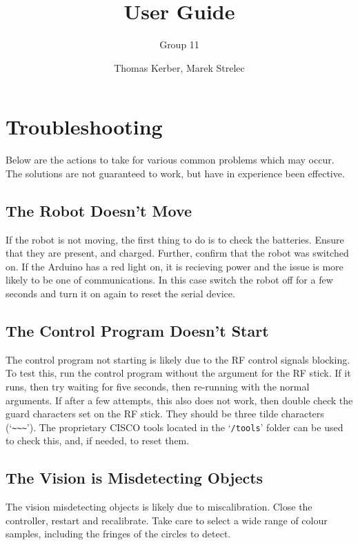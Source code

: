 \documentclass[a4paper,12pt]{scrartcl}
\author{Thomas Kerber, Marek Strelec}
\title{User Guide}
\subtitle{Group 11}
\begin{document}
\maketitle





\section{Troubleshooting}

Below are the actions to take for various common problems which may occur. The
solutions are not guaranteed to work, but have in experience been effective.

\subsection{The Robot Doesn't Move}

If the robot is not moving, the first thing to do is to check the batteries.
Ensure that they are present, and charged. Further, confirm that the robot was
switched on. If the Arduino has a red light on, it is recieving power and the
issue is more likely to be one of communications. In this case switch the robot
off for a few seconds and turn it on again to reset the serial device.

\subsection{The Control Program Doesn't Start}

The control program not starting is likely due to the RF control signals
blocking. To test this, run the control program without the argument for the RF
stick. If it runs, then try waiting for five seconds, then re-running with the
normal arguments. If after a few attempts, this also does not work, then double
check the guard characters set on the RF stick. They should be three tilde
characters (`\verb$~~~$'). The proprietary CISCO tools located in the
`\texttt{/tools}' folder can be used to check this, and, if needed, to reset
them.

\subsection{The Vision is Misdetecting Objects}

The vision misdetecting objects is likely due to miscalibration. Close the
controller, restart and recalibrate. Take care to select a wide range of colour
samples, including the fringes of the circles to detect.
\end{document}
